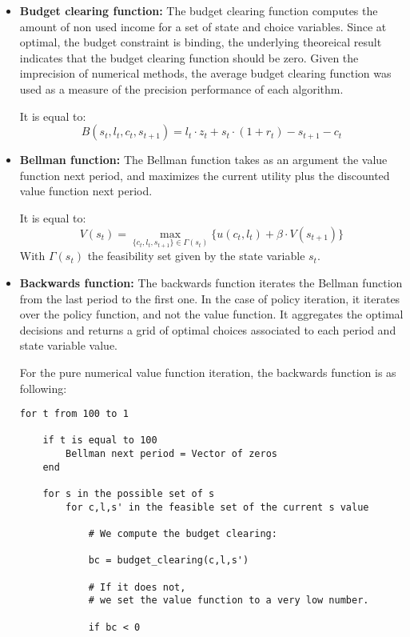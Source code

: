 \documentclass{article}
\begin{document}
\begin{itemize}
    \item \textbf{Budget clearing function: } 
    The budget clearing function computes the amount of non used income for a 
    set of state and choice variables. Since at optimal, the budget constraint is binding, 
    the underlying theoreical result indicates that the budget clearing function should be 
    zero. Given the imprecision of numerical methods, the average budget clearing function was used 
    as a measure of the precision performance of each algorithm.

    It is equal to: 
    $$B(s_{t},l_{t},c_{t},s_{t+1})=l_{t} \cdot z_{t} + s_{t}\cdot(1+r_{t}) - s_{t+1} - c_{t}$$

    \item \textbf{Bellman function: }
    The Bellman function takes as an argument the value function next period, 
    and maximizes the current utility plus the discounted value function next period. 

    It is equal to: 
    $$V(s_{t}) = \max_{\{c_{t},l_{t},s_{t+1}\}\in \Gamma(s_{t})} \{u(c_{t},l_{t}) + \beta \cdot V(s_{t+1})\}$$
    With $\Gamma(s_{t})$ the feasibility set given by the state variable $s_{t}$.

    \item \textbf{Backwards function: }
    The backwards function iterates the Bellman function from the last period 
    to the first one. In the case of policy iteration, it iterates over the 
    policy function, and not the value function. It aggregates the optimal decisions 
    and returns a grid of optimal choices associated to each period and state variable value.

    For the pure numerical value function iteration, the backwards function is
    as following: 
    \begin{lstlisting}
for t from 100 to 1

    if t is equal to 100
        Bellman next period = Vector of zeros
    end

    for s in the possible set of s
        for c,l,s' in the feasible set of the current s value
            
            # We compute the budget clearing: 

            bc = budget_clearing(c,l,s') 

            # If it does not,
            # we set the value function to a very low number.
            
            if bc < 0


\end{lstlisting}
\end{itemize}
\end{document}
